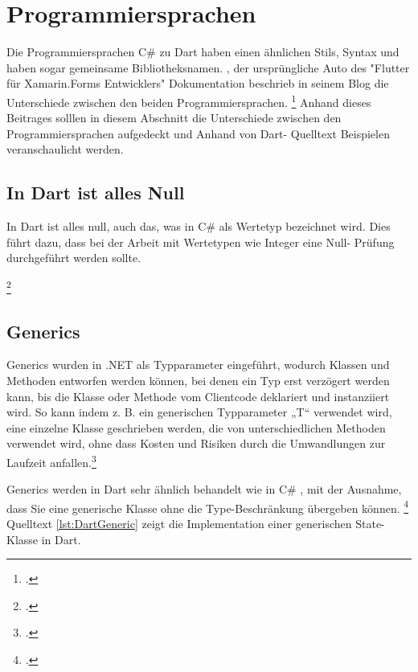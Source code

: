 \section{Programmiersprachen}
Die Programmiersprachen C\# zu Dart haben einen ähnlichen Stils,  Syntax und haben sogar gemeinsame Bibliotheksnamen.  \citeauthor{Pedley2019}, der ursprüngliche Auto des "Flutter für Xamarin.Forms Entwicklers" Dokumentation beschrieb in seinem Blog die Unterschiede zwischen den beiden Programmiersprachen. \footcite[Vgl. ][Abgerufen am \today]{Pedley2019} Anhand dieses Beitrages solllen in diesem Abschnitt die Unterschiede zwischen den Programmiersprachen aufgedeckt und Anhand von Dart- Quelltext Beispielen veranschaulicht werden.    
\subsection{In Dart ist alles Null}
In Dart ist alles null, auch das, was in C\# als Wertetyp bezeichnet wird.  Dies führt dazu,  dass bei der Arbeit mit Wertetypen wie Integer eine Null- Prüfung durchgeführt werden sollte.

\begin{minipage}{\linewidth}

\end{minipage}
\footcitetext[In Anlehnung an ][Abgerufen am \today]{Pedley2019}


\subsection{Generics}
Generics wurden in .NET als Typparameter eingeführt,  wodurch Klassen und Methoden entworfen werden können, bei denen ein Typ erst verzögert werden kann,  bis die Klasse oder Methode vom Clientcode deklariert und instanziiert wird.  So kann indem z. B. ein generischen Typparameter „T“ verwendet wird,  eine einzelne Klasse geschrieben werden, die von unterschiedlichen Methoden verwendet wird, ohne dass Kosten und Risiken durch die Umwandlungen zur Laufzeit anfallen.\footcite[Vgl. ][Abgerufen am \today]{MicrosoftGenerics2015} 

Generics werden in Dart sehr ähnlich behandelt wie in C\# ,  mit der Ausnahme,  dass Sie eine generische Klasse ohne die Type-Beschränkung übergeben können.  \footcite[Vgl.][S. 98]{Cheng2019} Quelltext \ref{lst:DartGeneric} zeigt die Implementation einer generischen State-Klasse in Dart. 

